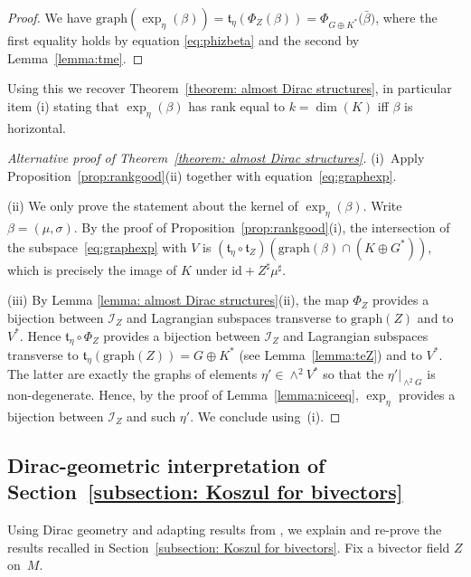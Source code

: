 \documentclass[10pt,a4paper]{amsart}
\numberwithin{equation}{section}
\newcommand{\id}{\mathrm{id}}
\renewcommand{\t}{\mathfrak{t}}
\begin{document}
 \begin{proof}We have $\mathrm{graph}(\exp_{\eta}(\beta))=\t_\eta(\Phi_Z(\beta))=\Phi_{G\oplus K^*}\big(\bar{\beta}\big)$, where the first equality holds by equation \eqref{eq:phizbeta} and the second by Lemma~\ref{lemma:tme}.
\end{proof}

Using this we recover Theorem~\ref{theorem: almost Dirac structures}, in particular item (i) stating that $\exp_{\eta}(\beta)$ has rank equal to $k=\dim(K)$ if{f} $\beta$ is horizontal.


\begin{proof}[Alternative proof of Theorem~\ref{theorem: almost Dirac structures}] {\sloppy (i)~Apply Proposition~\ref{prop:rankgood}(ii) together with equa\-tion~\eqref{eq:graphexp}.

}

(ii) {We only prove the statement about the kernel of $\exp_{\eta}(\beta)$. Write $\beta = (\mu,\sigma)$. By the proof of Proposition~\ref{prop:rankgood}(i), the intersection of the {subspace~\eqref{eq:graphexp} with $V$} is $(\t_{\eta}\circ \t_{Z})(\mathrm{graph}(\beta)\cap (K\oplus G^*))$, which is precisely the image of $K$ under $\id + Z^\sharp \mu^\sharp $.}

(iii) By Lemma \ref{lemma: almost Dirac structures}(ii), the map $\Phi_Z$ provides a bijection between $\mathcal{I}_Z$ and Lagrangian subspaces transverse to ${\mathrm{graph}(Z)}$ and to $V^*$. Hence $\t_\eta \circ \Phi_Z$
provides a bijection between $\mathcal{I}_Z$ and Lagrangian subspaces transverse to $\t_\eta({\mathrm{graph}(Z)})=G\oplus K^*$ (see Lemma~\ref{lemma:teZ}) and to $V^*$. The latter are exactly the graphs of elements $\eta' \in \wedge^2 V^*$ so that the $\eta'|_{\wedge^2G}$ is non-degenerate. Hence, by the proof of Lemma~\ref{lemma:niceeq}, $\exp_{\eta}$ provides a bijection between $\mathcal{I}_Z$ and such $\eta'$. We conclude using~(i).
\end{proof}


\subsection{Dirac-geometric interpretation of Section~\ref{subsection: Koszul for bivectors}}\label{subsection: integrability via Dirac geometry}

Using Dirac geometry {and adapting results from \cite{FZgeo}}, we explain and re-prove {the} results recalled in Section~\ref{subsection: Koszul for bivectors}. Fix a bivector field $Z$ on~$M$.
\end{document}
